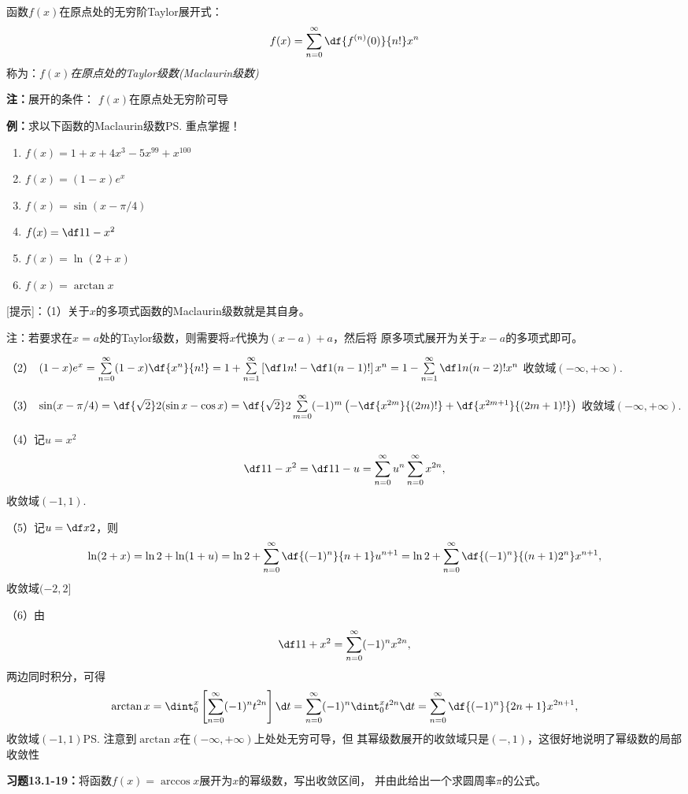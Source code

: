 函数$f(x)$在原点处的无穷阶Taylor展开式： 
$$f(x)=\sum\limits_{n=0}^{\infty}\df{f^{(n)}(0)}{n!}x^n$$
 称为：{\it $f(x)$在原点处的Taylor级数(Maclaurin级数)} 
 
{\bf 注：}展开的条件： $f(x)$在原点处无穷阶可导

{\bf 例：}求以下函数的Maclaurin级数\ps{重点掌握！}

\begin{enumerate}[(1)]
  \setlength{\itemindent}{1cm}
  \item $f(x)=1+x+4x^3-5x^{99}+x^{100}$ 
  \item $f(x)=(1-x)e^x$ 
  \item $f(x)=\sin(x-\pi/4)$ 
  \item $f(x)=\df 1{1-x^2}$ 
  \item $f(x)=\ln(2+x)$ 
  \item $f(x)=\arctan x$
\end{enumerate}

[提示]：（1）关于$x$的多项式函数的Maclaurin级数就是其自身。

注：若要求在$x=a$处的Taylor级数，则需要将$x$代换为$(x-a)+a$，然后将
原多项式展开为关于$x-a$的多项式即可。

（2）
$(1-x)e^x=\sum\limits_{n=0}^{\infty}(1-x)\df{x^n}{n!}
=1+\sum\limits_{n=1}^{\infty}\left[\df1{n!}-\df1{(n-1)!}\right]x^n
=1-\sum\limits_{n=1}^{\infty}\df1{n(n-2)!}x^n$
收敛域$(-\infty,+\infty)$.

（3）
$\sin(x-\pi/4)=\df{\sqrt2}2(\sin x-\cos x)
=\df{\sqrt2}2\sum\limits_{m=0}^{\infty}(-1)^m
\left(-\df{x^{2m}}{(2m)!}+\df{x^{2m+1}}{(2m+1)!}\right)$ 
收敛域$(-\infty,+\infty)$.

（4）记$u=x^2$
$$\df 1{1-x^2}=\df1{1-u}=\sum\limits_{n=0}^{\infty}u^n
\sum\limits_{n=0}^{\infty}x^{2n},$$
收敛域$(-1,1)$.

（5）记$u=\df x2$，则
$$\ln(2+x)=\ln2+\ln(1+u)
=\ln2+\sum\limits_{n=0}^{\infty}\df{(-1)^n}{n+1}u^{n+1}
=\ln2+\sum\limits_{n=0}^{\infty}\df{(-1)^n}{(n+1)2^n}x^{n+1},$$
收敛域$(-2,2]$

（6）由
$$\df1{1+x^2}=\sum\limits_{n=0}^{\infty}(-1)^nx^{2n},$$
两边同时积分，可得
$$\arctan x=\dint_0^x\left[\sum\limits_{n=0}^{\infty}(-1)^nt^{2n}\right]\d t
=\sum\limits_{n=0}^{\infty}(-1)^n\dint_0^xt^{2n}\d t
=\sum\limits_{n=0}^{\infty}\df{(-1)^n}{2n+1}x^{2n+1},$$
收敛域$(-1,1)$\ps{注意到$\arctan x$在$(-\infty,+\infty)$上处处无穷可导，但
其幂级数展开的收敛域只是$(-,1)$，这很好地说明了幂级数的局部收敛性}

{\bf 习题13.1-19：}将函数$f(x)=\arccos x$展开为$x$的幂级数，写出收敛区间，
并由此给出一个求圆周率$\pi$的公式。

